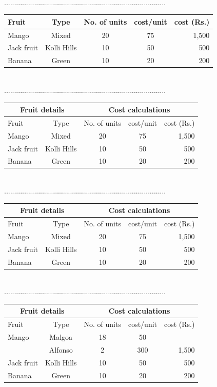 \documentclass[12pt,a4paper]{article}
\begin{document}
\\.................................................................................\\
\begin{tabular}{||l|c|c|c|r|}\hline %
Fruit & Type & No. of units & cost/unit & cost (Rs.)\\ \hline
Mango & Mixed & 20 & 75 & 1,500 \\ \hline
Jack fruit & Kolli Hills & 10 & 50 & 500\\ \hline
Banana & Green & 10 & 20 & 200\\ \hline
\end{tabular}
\\.................................................................................\\
\begin{tabular}{||l|c|c|c|r|}\hline
\multicolumn{2}{c}{Fruit details} & \multicolumn{3}{c}{Cost calculations} \\ \hline %
Fruit & Type & No. of units & cost/unit & cost (Rs.)\\ \hline
Mango & Mixed & 20 & 75 & 1,500 \\ \hline
Jack fruit & Kolli Hills & 10 & 50 & 500\\ \hline
Banana & Green & 10 & 20 & 200\\ \hline
\end{tabular}
\\.................................................................................\\
\begin{tabular}{||l|c|c|c|r|}\hline
\multicolumn{2}{||c|}{Fruit details} & \multicolumn{3}{c|}{Cost calculations} \\ \hline
Fruit & Type & No. of units & cost/unit & cost (Rs.)\\ \hline
Mango & Mixed & 20 & 75 & 1,500 \\ \hline
Jack fruit & Kolli Hills & 10 & 50 & 500\\ \hline
Banana & Green & 10 & 20 & 200\\ \hline
\end{tabular}
\\.................................................................................\\
\begin{tabular}{||l|c|c|c|r|}\hline
\multicolumn{2}{||c|}{Fruit details} & \multicolumn{3}{c|}{Cost calculations} \\ \hline
Fruit & Type & No. of units & cost/unit & cost (Rs.)\\ \hline
Mango & Malgoa & 18 & 50 & \\ \hline %
		 & Alfonso & 2 & 300 & 1,500 \\ \hline
Jack fruit & Kolli Hills & 10 & 50 & 500\\ \hline
Banana & Green & 10 & 20 & 200\\ \hline
\end{tabular}
\end{document}
